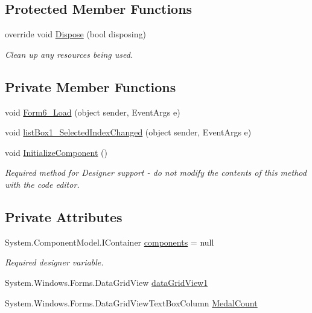 \subsection*{Protected Member Functions}
\begin{DoxyCompactItemize}
\item 
override void \hyperlink{classPCO_1_1__0_1_1Display_aeec182b8e0272728a07deb3245fb3ef2}{Dispose} (bool disposing)
\begin{DoxyCompactList}\small\item\em Clean up any resources being used. \end{DoxyCompactList}\end{DoxyCompactItemize}
\subsection*{Private Member Functions}
\begin{DoxyCompactItemize}
\item 
void \hyperlink{classPCO_1_1__0_1_1Display_aa37caaa188d791b95b8d79dc1bbc953e}{Form6\+\_\+\+Load} (object sender, Event\+Args e)
\item 
void \hyperlink{classPCO_1_1__0_1_1Display_a79a83d7954cbce514cdaa8336a5af2b8}{list\+Box1\+\_\+\+Selected\+Index\+Changed} (object sender, Event\+Args e)
\item 
void \hyperlink{classPCO_1_1__0_1_1Display_a4c56052f9f51cbdff10fcb1a4d55f750}{Initialize\+Component} ()
\begin{DoxyCompactList}\small\item\em Required method for Designer support -\/ do not modify the contents of this method with the code editor. \end{DoxyCompactList}\end{DoxyCompactItemize}
\subsection*{Private Attributes}
\begin{DoxyCompactItemize}
\item 
System.\+Component\+Model.\+I\+Container \hyperlink{classPCO_1_1__0_1_1Display_a85da09902d8b1e0f454a66ad815d6090}{components} = null
\begin{DoxyCompactList}\small\item\em Required designer variable. \end{DoxyCompactList}\item 
System.\+Windows.\+Forms.\+Data\+Grid\+View \hyperlink{classPCO_1_1__0_1_1Display_a6ce931b1d769166bae50e36dd725f25b}{data\+Grid\+View1}
\item 
System.\+Windows.\+Forms.\+Data\+Grid\+View\+Text\+Box\+Column \hyperlink{classPCO_1_1__0_1_1Display_adce8cb6a82a4b034fe3b85f2192a0176}{Medal\+Count}
\end{DoxyCompactItemize}



